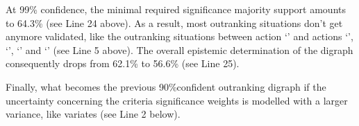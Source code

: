 \documentclass[a4paper,12pt,english]{sphinxhowto}
\begin{document}
\begin{sphinxVerbatim}[commandchars=\\\{\},numbers=left,firstnumber=1,stepnumber=1]
\end{sphinxVerbatim}
\sphinxresetverbatimhllines

\sphinxAtStartPar
At 99\% confidence, the minimal required significance majority support amounts to 64.3\% (see Line 24 above). As a result, most outranking situations don’t get anymore validated, like the outranking situations between action ‘’ and actions ‘’, ‘’, ‘’ and ‘’ (see Line 5 above). The overall epistemic determination of the digraph consequently drops from 62.1\% to 56.6\% (see Line 25).

\sphinxAtStartPar
Finally, what becomes the previous 90\%\sphinxhyphen{}confident outranking digraph if the uncertainty concerning the criteria significance weights is modelled with a larger variance, like  variates (see Line 2 below).
\end{document}
